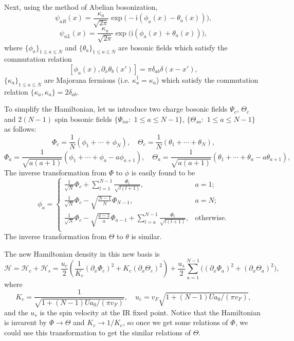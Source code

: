 \documentclass[10pt]{extarticle}
\newcommand{\ii}{\mathrm{i}}
\begin{document}
Next, using the method of Abelian bosonization, 
\begin{equation}
	\psi_{aR}(x)=\frac{\kappa_a}{\sqrt{2\pi}}\exp\bigl(-\ii (\phi_a(x)-\theta_a(x))\bigr),
	\label{psiR}
\end{equation}
\begin{equation}
	\psi_{aL}(x)=\frac{\kappa_a}{\sqrt{2\pi}}\exp\bigl(\ii (\phi_a(x)+\theta_a(x))\bigr),
	\label{psiL}
\end{equation}
where $\{\phi_a\}_{1\leq a \leq N}$ and $\{\theta_a\}_{1\leq a \leq N}$ are bosonic fields which satisfy the commutation relation 
\[
	[\phi_a(x),\partial_x\theta_b(x')]=\pi \delta_{ab}\delta(x-x'),
\]
$\{\kappa_a\}_{1\leq a \leq N}$ are Majorana fermions (i.e. $\kappa_a^\dag=\kappa_a$) which satisfy the commutation relation $\{\kappa_a,\kappa_a\}=2\delta_{ab}$.

To simplify the Hamiltonian, let us introduce two charge bosonic fields $\Psi_c$, $\Theta_c$ and $2(N-1)$ spin bosonic fields $\{\Psi_{na}:$ $1\leq a\leq N-1\}$, $\{\Theta_{sa}:$ $1\leq a\leq N-1\}$ as follows:
\[
	\Phi_c =\frac{1}{N}(\phi_1+\cdots+\phi_N),\quad \Theta_c =\frac{1}{N}(\theta_1+\cdots+\theta_N),
\]
\[
	\Phi_{a} =\frac{1}{\sqrt{a(a+1)}}(\phi_1+\cdots+\phi_a-a\phi_{a+1}),\quad \Theta_{a} =\frac{1}{\sqrt{a(a+1)}}(\theta_1+\cdots+\theta_a-a\theta_{a+1}),
\]
The inverse transformation from $\Phi$ to $\phi$ is easily found to be
\begin{equation}
	\phi_a=
	\begin{cases}
		\frac{1}{\sqrt{N}}\Phi_c+ \sum_{l=1}^{N-1}\frac{\Phi_{l}}{\sqrt{l(l+1)}},&a=1;\\
		\frac{1}{\sqrt{N}}\Phi_c - \sqrt{\frac{N-1}{N}}\Phi_{N-1},&a=N;\\
		\frac{1}{\sqrt{N}}\Phi_c - \sqrt{\frac{a-1}{a}}\Phi_{a-1} + \sum_{l=a}^{N-1}\frac{\Phi_{l}}{\sqrt{l(l+1)}},&\text{otherwise.}\\
	\end{cases}
\end{equation}
The inverse transformation from $\Theta$ to $\theta$ is similar.

The new Hamiltonian density in this new basis is
\[
	\mathcal{H}=\mathcal{H}_c+\mathcal{H}_s=\frac{u_c}{2}\left(\frac{1}{K_c}(\partial_x \Phi_c)^2+K_c (\partial_x \Theta_c)^2\right)+\frac{u_s}{2}\sum_{a=1}^{N-1}\bigl((\partial_x \Phi_a)^2+(\partial_x \Theta_a)^2\bigr),
\]
where 
\[
	K_c=\frac{1}{\sqrt{1+(N-1)Ua_0/(\pi v_F)}},\quad u_c=v_F \sqrt{1+(N-1)Ua_0/(\pi v_F)},
\]
and the $u_s$ is the spin velocity at the IR fixed point. Notice that the Hamiltonian is invarent by $\Phi\to \Theta$ and $K_c \to 1/K_c$, so once we get some relations of $\Phi$, we could use this transformation to get the similar relations of $\Theta$.
\end{document}
